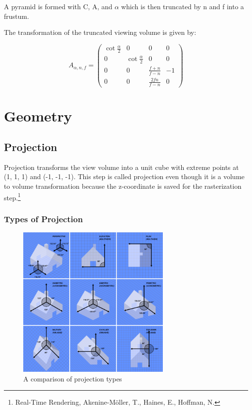 \documentclass{article}
\begin{document}
A pyramid is formed with C, A, and $\alpha$ which is then truncated by n and f into a frustum.

The transformation of the truncated viewing volume is given by:

\[A_{\alpha, n, f} = 
\begin{pmatrix}
\cot \frac{\alpha}{2} & 0 & 0 & 0 \\
0 & \cot \frac{\alpha}{2} & 0 & 0 \\
0 & 0 & \frac{f+n}{f-n} & -1 \\
0 & 0 & \frac{2fn}{f-n} & 0
\end{pmatrix}\]

\section{Geometry}

\subsection{Projection}
Projection transforms the view volume into a unit cube with extreme points at (1, 1, 1) and (-1, -1, -1). This step is called projection even though it is a volume to volume transformation because the z-coordinate is saved for the rasterization step.\footnote{Real-Time Rendering, Akenine-Möller, T., Haines, E., Hoffman, N.}

\subsubsection{Types of Projection}

\begin{figure}[H]
    \centering
    \includegraphics[width=3.0in]{Graphical_projection_comparison.png}
    \caption{A comparison of projection types}
    \label{projectiontypes}
\end{figure}
\end{document}
